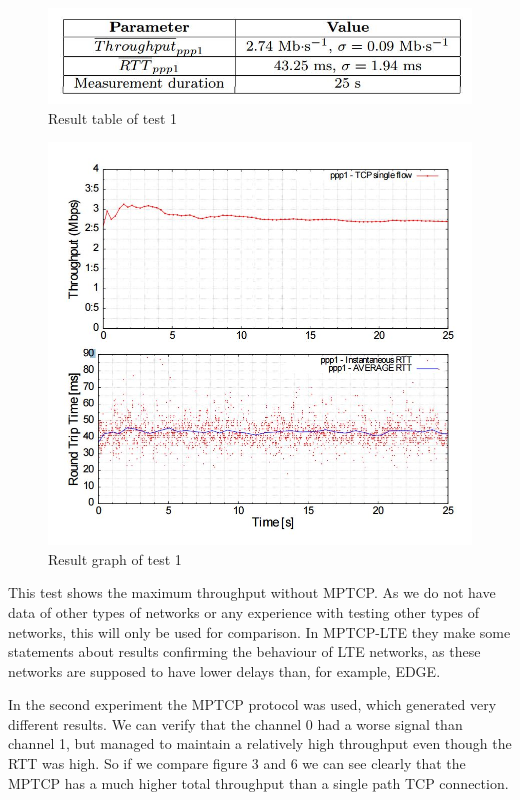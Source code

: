 \documentclass[11pt,twocolumn]{article}
\begin{document}
\begin{figure}[ht]
\begin{center}
\includegraphics[scale=0.6]{table_1}
\caption{Result table of test 1}
\end{center}
\end{figure}
\begin{figure}[ht]
\begin{center}
\includegraphics[scale=0.5]{graph_1}
\caption{Result graph of test 1}
\end{center}
\end{figure}

This test shows the maximum throughput without MPTCP. As we do not have data of other types of networks or any experience with testing other types of networks, this will only be used for comparison. In MPTCP-LTE\cite{MPTCP-LTE} they make some statements about results confirming the behaviour of LTE networks, as these networks are supposed to have lower delays than, for example, EDGE. 

In the second experiment the MPTCP protocol was used, which generated very different results. We can verify that the channel 0 had a worse signal than channel 1, but managed to maintain a relatively high throughput even though the RTT was high. So if we compare figure 3 and 6 we can see clearly that the MPTCP has a much higher total throughput than a single path TCP connection.
\end{document}

